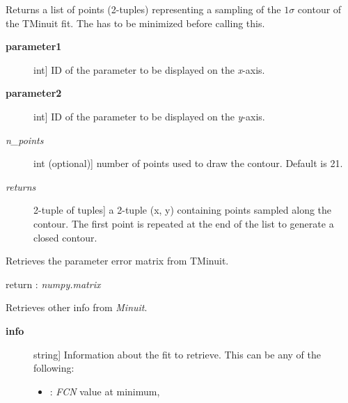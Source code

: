 \documentclass[a4paper,10pt,english]{sphinxmanual}
\begin{document}
\begin{fulllineitems}

\begin{fulllineitems}
\label{module_doc:kafe.minuit.Minuit.get_contour}
Returns a list of points (2-tuples) representing a sampling of
the \(1\sigma\) contour of the TMinuit fit. The  has
to be minimized before calling this.
\begin{description}
\item[{\textbf{parameter1}}] \leavevmode{[}int{]}
ID of the parameter to be displayed on the \emph{x}-axis.

\item[{\textbf{parameter2}}] \leavevmode{[}int{]}
ID of the parameter to be displayed on the \emph{y}-axis.

\item[{\emph{n\_points}}] \leavevmode{[}int (optional){]}
number of points used to draw the contour. Default is 21.

\item[{\emph{returns}}] \leavevmode{[}2-tuple of tuples{]}
a 2-tuple (x, y) containing  points sampled
along the contour. The first point is repeated at the end
of the list to generate a closed contour.

\end{description}

\end{fulllineitems}


\begin{fulllineitems}
\label{module_doc:kafe.minuit.Minuit.get_error_matrix}
Retrieves the parameter error matrix from TMinuit.

return : \emph{numpy.matrix}

\end{fulllineitems}


\begin{fulllineitems}
\label{module_doc:kafe.minuit.Minuit.get_fit_info}
Retrieves other info from \emph{Minuit}.
\begin{description}
\item[{\textbf{info}}] \leavevmode{[}string{]}
Information about the fit to retrieve.
This can be any of the following:
\begin{itemize}
\item {} 
: \emph{FCN} value at minimum,


\end{itemize}
\end{description}
\end{fulllineitems}
\end{fulllineitems}
\end{document}
